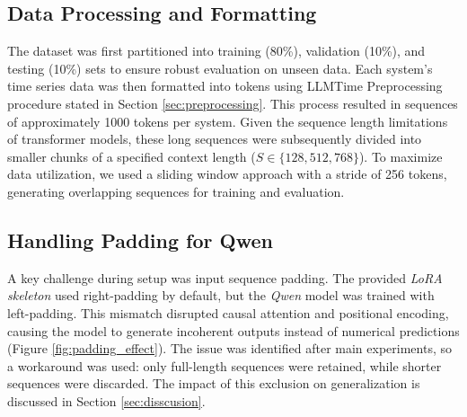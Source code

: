 \documentclass{article}
\begin{document}
\subsection{Data Processing and Formatting}

The dataset was first partitioned into training (80\%), validation (10\%), and testing (10\%) sets to ensure robust evaluation on unseen data. Each system's time series data was then formatted into tokens using LLMTime Preprocessing procedure stated in Section \ref{sec:preprocessing}. This process resulted in sequences of approximately 1000 tokens per system. Given the sequence length limitations of transformer models, these long sequences were subsequently divided into smaller chunks of a specified context length ($S \in \{128, 512, 768\}$). To maximize data utilization, we used a sliding window approach with a stride of 256 tokens, generating overlapping sequences for training and evaluation.

\subsection{Handling Padding for Qwen}
\label{sec:padding}

A key challenge during setup was input sequence padding. The provided \textit{LoRA skeleton} used right-padding by default, but the \textit{Qwen} model was trained with left-padding. This mismatch disrupted causal attention and positional encoding, causing the model to generate incoherent outputs instead of numerical predictions (Figure \ref{fig:padding_effect}). The issue was identified after main experiments, so a workaround was used: only full-length sequences were retained, while shorter sequences were discarded. The impact of this exclusion on generalization is discussed in Section \ref{sec:disscusion}.


\end{document}
